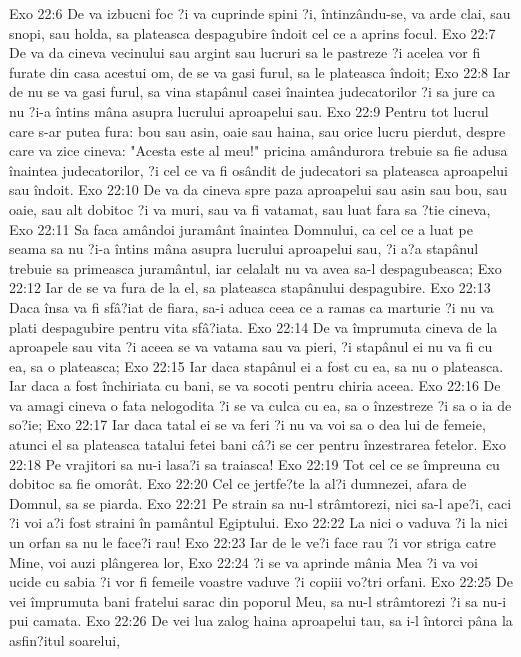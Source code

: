 Exo 22:6  De va izbucni foc ?i va cuprinde spini ?i, întinzându-se, va arde clai, sau snopi, sau holda, sa plateasca despagubire îndoit cel ce a aprins focul.
Exo 22:7  De va da cineva vecinului sau argint sau lucruri sa le pastreze ?i acelea vor fi furate din casa acestui om, de se va gasi furul, sa le plateasca îndoit;
Exo 22:8  Iar de nu se va gasi furul, sa vina stapânul casei înaintea judecatorilor ?i sa jure ca nu ?i-a întins mâna asupra lucrului aproapelui sau.
Exo 22:9  Pentru tot lucrul care s-ar putea fura: bou sau asin, oaie sau haina, sau orice lucru pierdut, despre care va zice cineva: "Acesta este al meu!" pricina amândurora trebuie sa fie adusa înaintea judecatorilor, ?i cel ce va fi osândit de judecatori sa plateasca aproapelui sau îndoit.
Exo 22:10  De va da cineva spre paza aproapelui sau asin sau bou, sau oaie, sau alt dobitoc ?i va muri, sau va fi vatamat, sau luat fara sa ?tie cineva,
Exo 22:11  Sa faca amândoi juramânt înaintea Domnului, ca cel ce a luat pe seama sa nu ?i-a întins mâna asupra lucrului aproapelui sau, ?i a?a stapânul trebuie sa primeasca juramântul, iar celalalt nu va avea sa-l despagubeasca;
Exo 22:12  Iar de se va fura de la el, sa plateasca stapânului despagubire.
Exo 22:13  Daca însa va fi sfâ?iat de fiara, sa-i aduca ceea ce a ramas ca marturie ?i nu va plati despagubire pentru vita sfâ?iata.
Exo 22:14  De va împrumuta cineva de la aproapele sau vita ?i aceea se va vatama sau va pieri, ?i stapânul ei nu va fi cu ea, sa o plateasca;
Exo 22:15  Iar daca stapânul ei a fost cu ea, sa nu o plateasca. Iar daca a fost închiriata cu bani, se va socoti pentru chiria aceea.
Exo 22:16  De va amagi cineva o fata nelogodita ?i se va culca cu ea, sa o înzestreze ?i sa o ia de so?ie;
Exo 22:17  Iar daca tatal ei se va feri ?i nu va voi sa o dea lui de femeie, atunci el sa plateasca tatalui fetei bani câ?i se cer pentru înzestrarea fetelor.
Exo 22:18  Pe vrajitori sa nu-i lasa?i sa traiasca!
Exo 22:19  Tot cel ce se împreuna cu dobitoc sa fie omorât.
Exo 22:20  Cel ce jertfe?te la al?i dumnezei, afara de Domnul, sa se piarda.
Exo 22:21  Pe strain sa nu-l strâmtorezi, nici sa-l ape?i, caci ?i voi a?i fost straini în pamântul Egiptului.
Exo 22:22  La nici o vaduva ?i la nici un orfan sa nu le face?i rau!
Exo 22:23  Iar de le ve?i face rau ?i vor striga catre Mine, voi auzi plângerea lor,
Exo 22:24  ?i se va aprinde mânia Mea ?i va voi ucide cu sabia ?i vor fi femeile voastre vaduve ?i copiii vo?tri orfani.
Exo 22:25  De vei împrumuta bani fratelui sarac din poporul Meu, sa nu-l strâmtorezi ?i sa nu-i pui camata.
Exo 22:26  De vei lua zalog haina aproapelui tau, sa i-l întorci pâna la asfin?itul soarelui,
